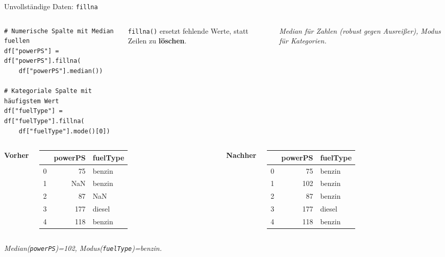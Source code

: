 \begin{frame}[fragile]{Unvollständige Daten: \texttt{fillna}}
\begin{columns}
\begin{verbatim}
# Numerische Spalte mit Median fuellen
df["powerPS"] = df["powerPS"].fillna(
    df["powerPS"].median())

# Kategoriale Spalte mit häufigstem Wert
df["fuelType"] = df["fuelType"].fillna(
    df["fuelType"].mode()[0])
\end{verbatim}

\texttt{fillna()} ersetzt fehlende Werte, statt Zeilen zu \textbf{löschen}.

\vspace{0.4em}
{\footnotesize\itshape Median für Zahlen (robust gegen Ausreißer), Modus
für Kategorien.}
\end{columns}

\vspace{0.5em}
\centering
{\footnotesize
\renewcommand{\arraystretch}{1.3}
\setlength{\tabcolsep}{6pt}
\begin{columns}
\centering
\textbf{Vorher}\\[2pt]
\begin{tabular}{r r l}
& \textbf{powerPS} & \textbf{fuelType}\\
\hline
0 &  75 & benzin\\
1 & \cellcolor{red!18}NaN & benzin\\
2 &  87 & \cellcolor{red!18}NaN\\
3 & 177 & diesel\\
4 & 118 & benzin\\
\end{tabular}

\centering
\textbf{Nachher}\\[2pt]
\begin{tabular}{r r l}
& \textbf{powerPS} & \textbf{fuelType}\\
\hline
0 &  75 & benzin\\
1 & \cellcolor{green!20}102 & benzin\\
2 &  87 & \cellcolor{green!20}benzin\\
3 & 177 & diesel\\
4 & 118 & benzin\\
\end{tabular}
\end{columns}}

\vspace{0.4em}
{\footnotesize\itshape Median(\texttt{powerPS})=102, Modus(\texttt{fuelType})=benzin.}

\end{frame}


